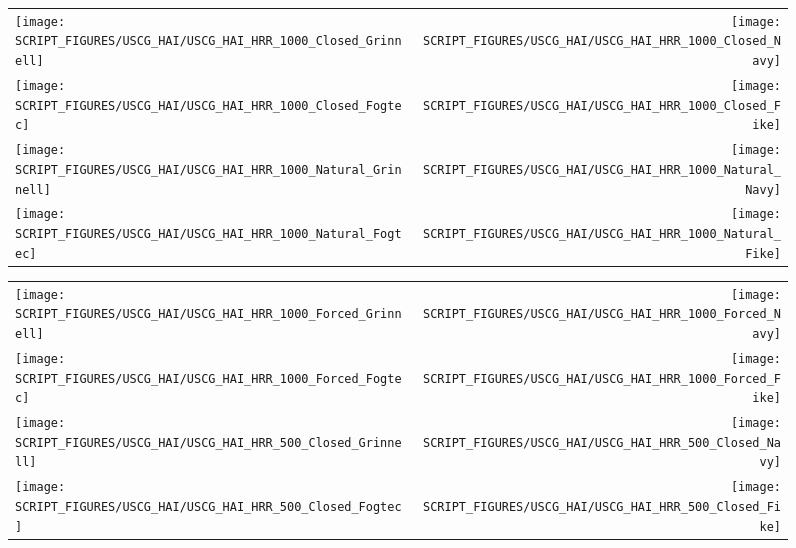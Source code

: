 


\newpage

\begin{figure}[p]
\begin{tabular*}{\textwidth}{l@{\extracolsep{\fill}}r}
\texttt{[image: SCRIPT\_FIGURES/USCG\_HAI/USCG\_HAI\_HRR\_1000\_Closed\_Grinnell]} &
\texttt{[image: SCRIPT\_FIGURES/USCG\_HAI/USCG\_HAI\_HRR\_1000\_Closed\_Navy]} \\
\texttt{[image: SCRIPT\_FIGURES/USCG\_HAI/USCG\_HAI\_HRR\_1000\_Closed\_Fogtec]} &
\texttt{[image: SCRIPT\_FIGURES/USCG\_HAI/USCG\_HAI\_HRR\_1000\_Closed\_Fike]} \\
\texttt{[image: SCRIPT\_FIGURES/USCG\_HAI/USCG\_HAI\_HRR\_1000\_Natural\_Grinnell]} &
\texttt{[image: SCRIPT\_FIGURES/USCG\_HAI/USCG\_HAI\_HRR\_1000\_Natural\_Navy]} \\
\texttt{[image: SCRIPT\_FIGURES/USCG\_HAI/USCG\_HAI\_HRR\_1000\_Natural\_Fogtec]} &
\texttt{[image: SCRIPT\_FIGURES/USCG\_HAI/USCG\_HAI\_HRR\_1000\_Natural\_Fike]}
\end{tabular*}
\label{USCG_HAI_2}
\end{figure}

\begin{figure}[p]
\begin{tabular*}{\textwidth}{l@{\extracolsep{\fill}}r}
\texttt{[image: SCRIPT\_FIGURES/USCG\_HAI/USCG\_HAI\_HRR\_1000\_Forced\_Grinnell]} &
\texttt{[image: SCRIPT\_FIGURES/USCG\_HAI/USCG\_HAI\_HRR\_1000\_Forced\_Navy]} \\
\texttt{[image: SCRIPT\_FIGURES/USCG\_HAI/USCG\_HAI\_HRR\_1000\_Forced\_Fogtec]} &
\texttt{[image: SCRIPT\_FIGURES/USCG\_HAI/USCG\_HAI\_HRR\_1000\_Forced\_Fike]} \\
\texttt{[image: SCRIPT\_FIGURES/USCG\_HAI/USCG\_HAI\_HRR\_500\_Closed\_Grinnell]} &
\texttt{[image: SCRIPT\_FIGURES/USCG\_HAI/USCG\_HAI\_HRR\_500\_Closed\_Navy]} \\
\texttt{[image: SCRIPT\_FIGURES/USCG\_HAI/USCG\_HAI\_HRR\_500\_Closed\_Fogtec]} &
\texttt{[image: SCRIPT\_FIGURES/USCG\_HAI/USCG\_HAI\_HRR\_500\_Closed\_Fike]}
\end{tabular*}
\label{USCG_HAI_4}
\end{figure}

